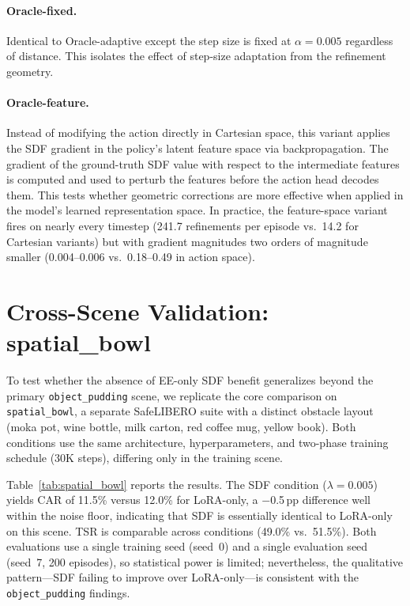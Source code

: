 \paragraph{Oracle-fixed.} Identical to Oracle-adaptive except the step size is fixed at $\alpha = 0.005$ regardless of distance. This isolates the effect of step-size adaptation from the refinement geometry.

\paragraph{Oracle-feature.} Instead of modifying the action directly in Cartesian space, this variant applies the SDF gradient in the policy's latent feature space via backpropagation. The gradient of the ground-truth SDF value with respect to the intermediate features is computed and used to perturb the features before the action head decodes them. This tests whether geometric corrections are more effective when applied in the model's learned representation space. In practice, the feature-space variant fires on nearly every timestep (241.7 refinements per episode vs.\ 14.2 for Cartesian variants) but with gradient magnitudes two orders of magnitude smaller (0.004--0.006 vs.\ 0.18--0.49 in action space).


\section{Cross-Scene Validation: spatial\_bowl}
\label{sec:appendix_spatial_bowl}

To test whether the absence of EE-only SDF benefit generalizes beyond the primary \texttt{object\_pudding} scene, we replicate the core comparison on \texttt{spatial\_bowl}, a separate SafeLIBERO suite with a distinct obstacle layout (moka pot, wine bottle, milk carton, red coffee mug, yellow book). Both conditions use the same architecture, hyperparameters, and two-phase training schedule (30K steps), differing only in the training scene.

Table~\ref{tab:spatial_bowl} reports the results. The SDF condition ($\lambda = 0.005$) yields CAR of 11.5\% versus 12.0\% for LoRA-only, a $-$0.5\,pp difference well within the noise floor, indicating that SDF is essentially identical to LoRA-only on this scene. TSR is comparable across conditions (49.0\% vs.\ 51.5\%). Both evaluations use a single training seed (seed~0) and a single evaluation seed (seed~7, 200 episodes), so statistical power is limited; nevertheless, the qualitative pattern---SDF failing to improve over LoRA-only---is consistent with the \texttt{object\_pudding} findings.

